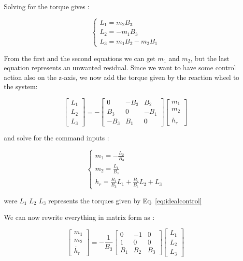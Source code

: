 \documentclass[11pt,a4paper]{report}
\begin{document}
Solving for the torque gives : 

\begin{equation}
 \begin{cases} L_1 = m_{2}B_{3}\\ L_2 = -m_{1}B_{3} \\ L_3 = m_{1}B_{2} - m_{2}B_{1} \end{cases}
\end{equation}

From the first and the second equations we can get $m_{1}$ and $m_2$, but the last equation represents an unwanted residual. Since we want to have some control action also on the z-axis, we now add the torque given by the reaction wheel to the system: 

\begin{equation}
 \begin{bmatrix}
    L_1\\
    L_2\\
    L_3
 \end{bmatrix}
= - 
 \begin{bmatrix}
    0 & -B_{3} & B_{2} \\
    B_{3} & 0 & -B_{1} \\
   -B_{3} & B_{1} & 0
 \end{bmatrix} 
 \begin{bmatrix}
    m_{1}\\
    m_{2}\\
    \dot{h_{r}}
 \end{bmatrix}  
\end{equation}

and solve for the command inputs : 

\begin{equation}
 \begin{cases} m_{1}=-\frac{L_2}{B_3}\\ m_2 = \frac{L_1}{B_3} \\ \dot{h_{r}} = \frac{B_1}{B_3}L_1 + \frac{B_2}{B_3} L_2 + L_3 \end{cases}
\end{equation}

were $L_1$ $L_2$ $L_3$ represents the torques given by Eq. \ref{eq:idealcontrol}

We can now rewrite everything in matrix form as : 

\begin{equation}
 \begin{bmatrix}
    m_1\\
    m_2\\
    \dot{h_{r}}
 \end{bmatrix}
= - \frac{1}{B_3}
 \begin{bmatrix}
    0 & -1 & 0 \\
    1 & 0 & 0 \\
    B_{1} & B_{2} & B_{3}
 \end{bmatrix} 
 \begin{bmatrix}
    L_{1}\\
    L_{2}\\
    L_{3}
 \end{bmatrix}  
\end{equation}
\end{document}

